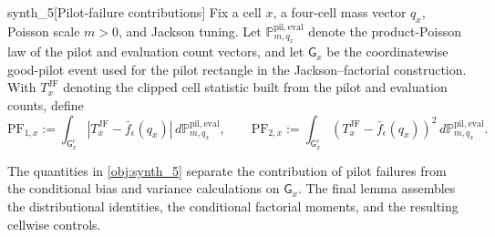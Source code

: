 \documentclass[11pt]{article}
\begin{document}
\begin{definitionv}{synth_5}[Pilot-failure contributions]
Fix a cell \(x\), a four-cell mass vector \(q_x\), Poisson scale \(m>0\), and Jackson tuning. Let \(\mathbb P_{m,q_x}^{\mathrm{pil,eval}}\) denote the product-Poisson law of the pilot and evaluation count vectors, and let \(\mathsf G_x\) be the coordinatewise good-pilot event used for the pilot rectangle in the Jackson--factorial construction. With \(T_x^{\mathrm{JF}}\) denoting the clipped cell statistic built from the pilot and evaluation counts, define \[ \mathrm{PF}_{1,x}:=\int_{\mathsf G_x^c}\left|T_x^{\mathrm{JF}}-\bar f_\epsilon(q_x)\right|\,d\mathbb P_{m,q_x}^{\mathrm{pil,eval}}, \qquad \mathrm{PF}_{2,x}:=\int_{\mathsf G_x^c}\left(T_x^{\mathrm{JF}}-\bar f_\epsilon(q_x)\right)^2\,d\mathbb P_{m,q_x}^{\mathrm{pil,eval}}. \]
\end{definitionv}

The quantities in \cref{obj:synth_5} separate the contribution of pilot failures from the conditional bias and variance calculations on \(\mathsf G_x\). The final lemma assembles the distributional identities, the conditional factorial moments, and the resulting cellwise controls.
\end{document}
